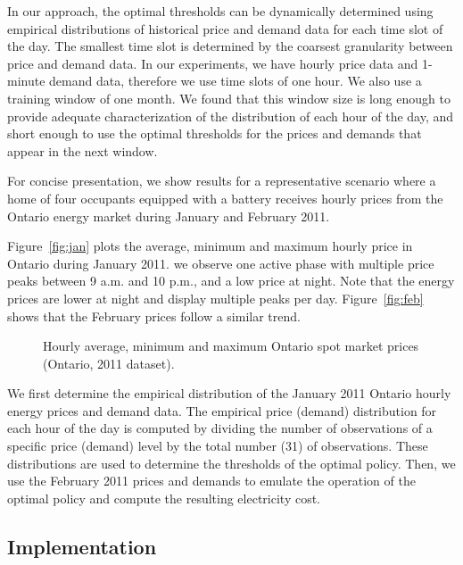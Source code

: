 \documentclass[journal]{IEEEtran}
\newcommand\1{\mathbf{1}}
\begin{document}
In our approach, the optimal thresholds can be dynamically determined using empirical
distributions of historical price and demand data for each time slot of the day.
The smallest time slot is determined by the coarsest granularity between
price and demand data. In our experiments, we have hourly price data
and 1-minute demand data, therefore we use time slots of one hour.
We also use a training window of one month.
We found that this window size is long enough
to provide adequate characterization of the distribution of each hour of the day,
and short enough to use the optimal thresholds for the prices
and demands that appear in the next window.

For concise presentation, we show results for a representative scenario
where a home of four occupants equipped with a battery receives hourly prices
from the Ontario energy market during January and February 2011.

Figure~\ref{fig:jan} plots the average, minimum and maximum hourly price in Ontario during January 2011.
we observe one active phase with multiple price peaks between 9 a.m. and 10 p.m., and a low price at night.
Note that the energy prices are lower at night and display multiple peaks per day.
Figure~\ref{fig:feb} shows that the February prices follow a similar trend.

\begin{figure}[h]
    \begin{center}
        \hspace{0.2cm}
    \end{center}
    \caption{Hourly average, minimum and maximum Ontario spot market prices (Ontario, 2011 dataset).}
    \label{fig:ontario_price}
\end{figure}

We first determine the empirical distribution of the January
2011 Ontario hourly energy prices and demand data. The empirical price (demand) distribution for each hour of the day
is computed by dividing the number of observations of a specific price (demand) level by the total number (31)
of observations. These distributions are used to determine the thresholds of the optimal policy.
Then, we use the February 2011 prices and demands to emulate the operation of the
optimal policy and compute the resulting electricity cost.


\subsection{Implementation}
\end{document}
